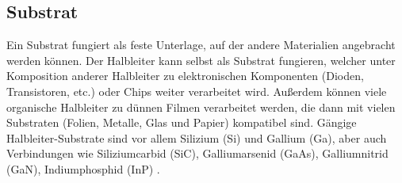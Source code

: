 \subsection{\label{subsec:FZV5}Substrat}
Ein Substrat fungiert als feste Unterlage, auf der andere Materialien angebracht werden können. 
Der Halbleiter kann selbst als Substrat fungieren, welcher unter Komposition 
anderer Halbleiter zu elektronischen Komponenten (Dioden, Transistoren, etc.) oder Chips weiter verarbeitet wird. 
Außerdem können viele organische Halbleiter zu dünnen Filmen verarbeitet werden, die dann mit vielen Substraten 
(Folien, Metalle, Glas und Papier) kompatibel sind.  
Gängige Halbleiter-Substrate sind vor allem Silizium (Si) und Gallium (Ga), aber auch Verbindungen wie 
Siliziumcarbid (SiC), Galliumarsenid (GaAs), Galliumnitrid (GaN), Indiumphosphid (InP) \cite{Substrat, EPC}. \\
